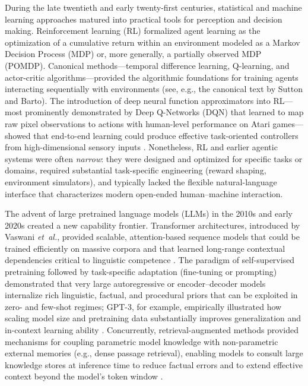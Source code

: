 During the late twentieth and early twenty-first centuries, statistical and machine learning approaches matured into practical tools for perception and decision making.  Reinforcement learning (RL) formalized agent learning as the optimization of a cumulative return within an environment modeled as a Markov Decision Process (MDP) or, more generally, a partially observed MDP (POMDP).  Canonical methods—temporal difference learning, Q-learning, and actor-critic algorithms—provided the algorithmic foundations for training agents interacting sequentially with environments (see, e.g., the canonical text by Sutton and Barto).  The introduction of deep neural function approximators into RL—most prominently demonstrated by Deep Q-Networks (DQN) that learned to map raw pixel observations to actions with human-level performance on Atari games—showed that end-to-end learning could produce effective task-oriented controllers from high-dimensional sensory inputs \cite{mnih15,sutton98}.  Nonetheless, RL and earlier agentic systems were often \emph{narrow}: they were designed and optimized for specific tasks or domains, required substantial task-specific engineering (reward shaping, environment simulators), and typically lacked the flexible natural-language interface that characterizes modern open-ended human–machine interaction.

The advent of large pretrained language models (LLMs) in the 2010s and early 2020s created a new capability frontier.  Transformer architectures, introduced by Vaswani \emph{et~al.}, provided scalable, attention-based sequence models that could be trained efficiently on massive corpora and that learned long-range contextual dependencies critical to linguistic competence \cite{vaswani17}.  The paradigm of self-supervised pretraining followed by task-specific adaptation (fine-tuning or prompting) demonstrated that very large autoregressive or encoder–decoder models internalize rich linguistic, factual, and procedural priors that can be exploited in zero- and few-shot regimes; GPT-3, for example, empirically illustrated how scaling model size and pretraining data substantially improves generalization and in-context learning ability \cite{brown20}.  Concurrently, retrieval-augmented methods provided mechanisms for coupling parametric model knowledge with non-parametric external memories (e.g., dense passage retrieval), enabling models to consult large knowledge stores at inference time to reduce factual errors and to extend effective context beyond the model's token window \cite{lewis20}.


